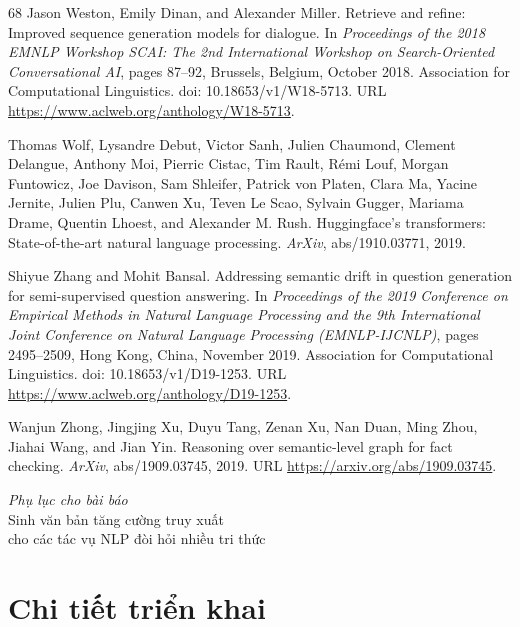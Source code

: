 \documentclass[10pt,letterpaper]{article}
\begin{document}
{\begin{thebibliography}{68}
 Jason Weston, Emily Dinan, and Alexander Miller. Retrieve and
refine: Improved sequence generation models for dialogue. In \emph{Proceedings
of the 2018 EMNLP Workshop SCAI: The 2nd International Workshop on
Search-Oriented Conversational AI}, pages 87--92, Brussels, Belgium, October
2018. Association for Computational Linguistics. doi: 10.18653/v1/W18-5713.
URL \url{https://www.aclweb.org/anthology/W18-5713}.

 Thomas Wolf, Lysandre Debut, Victor Sanh, Julien Chaumond, Clement
Delangue, Anthony Moi, Pierric Cistac, Tim Rault, Rémi Louf, Morgan Funtowicz,
Joe Davison, Sam Shleifer, Patrick von Platen, Clara Ma, Yacine Jernite, Julien
Plu, Canwen Xu, Teven Le Scao, Sylvain Gugger, Mariama Drame, Quentin Lhoest,
and Alexander M. Rush. Huggingface's transformers: State-of-the-art natural
language processing. \emph{ArXiv}, abs/1910.03771, 2019.

 Shiyue Zhang and Mohit Bansal. Addressing semantic drift in
question generation for semi-supervised question answering. In
\emph{Proceedings of the 2019 Conference on Empirical Methods in Natural
Language Processing and the 9th International Joint Conference on Natural
Language Processing (EMNLP-IJCNLP)}, pages 2495--2509, Hong Kong, China,
November 2019. Association for Computational Linguistics. doi:
10.18653/v1/D19-1253. URL \url{https://www.aclweb.org/anthology/D19-1253}.

 Wanjun Zhong, Jingjing Xu, Duyu Tang, Zenan Xu, Nan Duan, Ming
Zhou, Jiahai Wang, and Jian Yin. Reasoning over semantic-level graph for fact
checking. \emph{ArXiv}, abs/1909.03745, 2019. URL
\url{https://arxiv.org/abs/1909.03745}.

\end{thebibliography}
}

\clearpage
\appendix

\begin{center}
  {\Large \textit{Phụ lục cho bài báo}\\[3pt]
   Sinh văn bản tăng cường truy xuất\\[2pt]
   cho các tác vụ NLP đòi hỏi nhiều tri thức\par}
\end{center}
\vspace{6pt}

\section{Chi tiết triển khai}
\end{document}
